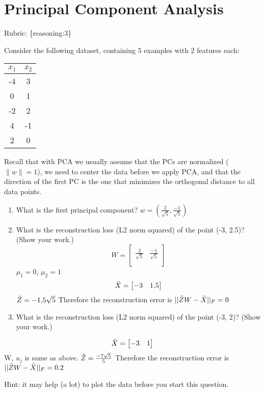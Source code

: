 \documentclass{article}
\def\rubric#1{\gre{Rubric: \{#1\}}}{}
\def\blu#1{{\color{blu}#1}}
\def\gre#1{{\color{gre}#1}}
\def\red#1{{\color{red}#1}}
\def\norm#1{\|#1\|}
\def\enum#1{\begin{enumerate}#1\end{enumerate}}
\begin{document}
\section{Principal Component Analysis}
\rubric{reasoning:3}


Consider the following dataset, containing 5 examples with 2 features each:
\begin{center}
\begin{tabular}{cc}
$x_1$ & $x_2$\\
\hline
-4 & 3\\
0 & 1\\
-2 & 2\\
4 & -1\\
2 & 0\\
\end{tabular}
\end{center}
Recall that with PCA we usually assume that the PCs are normalized ($\norm{w} = 1$), we need to center the data before we apply PCA, and that the direction of the first PC is the one that minimizes the orthogonal distance to all data points.
\blu{
\enum{
\item What is the first principal component?
\red{$w = (\frac{2}{\sqrt{5}},\frac{-1}{\sqrt{5}})$}
\item What is the reconstruction loss (L2 norm squared) of the point (-3, 2.5)? (Show your work.)
\red{
\[
W=
  \begin{bmatrix}
    \frac{2}{\sqrt{5}} & \frac{-1}{\sqrt{5}} \\
  \end{bmatrix}
\]
$\mu_{1} = 0$, $\mu_{2} = 1$
\[
\Tilde{X}=
  \begin{bmatrix}
    -3 & 1.5 \\
  \end{bmatrix}
\]
$\Tilde{Z} = -1.5\sqrt{5}$ \newline
Therefore the reconstruction error is \newline  $||\Tilde{Z}W-\Tilde{X}||_{F} = 0$
}
\item What is the reconstruction loss (L2 norm squared) of the point (-3, 2)? (Show your work.)
}
\red{
\[
\Tilde{X}=
  \begin{bmatrix}
    -3 & 1 \\
  \end{bmatrix}
\]\newline W, $u_{j}$ is same as above.\newline
 $\Tilde{Z}=\frac{-7\sqrt{5}}{5}$\newline
 Therefore the reconstruction error is \newline  $||\Tilde{Z}W-\Tilde{X}||_{F} = 0.2$\newline
}
}
Hint: it may help (a lot) to plot the data before you start this question.
\end{document}
